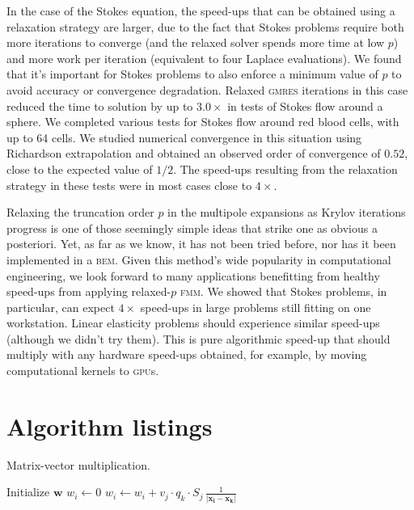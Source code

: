 \documentclass[final,3p,times]{elsarticle}
\newcommand{\gpu}{\textsc{gpu}}
\newcommand{\bem}{\textsc{bem}\xspace}
\newcommand{\fmm}{\textsc{fmm}\xspace}
\newcommand{\gmres}{\textsc{gmres}\xspace}
\begin{document}
In the case of the Stokes equation, the speed-ups that can be obtained using a relaxation strategy are larger, due to the fact that Stokes problems require both more iterations to converge (and the relaxed solver spends more time at low $p$) and more work per iteration (equivalent to four Laplace evaluations). 
We found that it's important for Stokes problems to also enforce a minimum value of $p$ to avoid accuracy or convergence degradation.
Relaxed \gmres iterations in this case reduced the time to solution by up to $3.0\times$ in tests of Stokes flow around a sphere. 
We completed various tests for Stokes flow around red blood cells, with up to 64 cells. We studied numerical convergence in this situation using Richardson extrapolation and obtained an observed order of convergence of $0.52$, close to the expected value of $1/2$. The speed-ups resulting from the relaxation strategy in these tests were in most cases close to $4\times$.

Relaxing the truncation order $p$ in the multipole expansions as Krylov iterations progress is one of those seemingly simple ideas that strike one as obvious a posteriori. Yet, as far as we know, it has not been tried before, nor has it been implemented in a \bem. Given this method's wide popularity in computational engineering, we look forward to many applications benefitting from healthy speed-ups from applying relaxed-$p$ \fmm. We  showed that Stokes problems, in particular, can expect $4\times$ speed-ups in large problems still fitting on one workstation. Linear elasticity problems should experience similar speed-ups (although we didn't try them). This is pure algorithmic speed-up that should multiply with any hardware speed-ups obtained, for example, by moving computational kernels to \gpu s.

\appendix
\section{Algorithm listings}\label{sec:algorithms}
 
 \begin{algorithm}
 \footnotesize
	\caption{Matrix-vector multiplication.}
	\label{alg:matvec}
	\begin{algorithmic}
		\State Initialize $\mathbf{w}$
			\State $w_i \gets 0$
				\State $w_i \gets w_i + v_j \cdot q_k \cdot S_j \, \frac{1}{|\mathbf{x_i}-\mathbf{x_k}|}$
				\EndFor
			\EndFor
		\EndFor 
	\end{algorithmic}
\end{algorithm}
\end{document}
